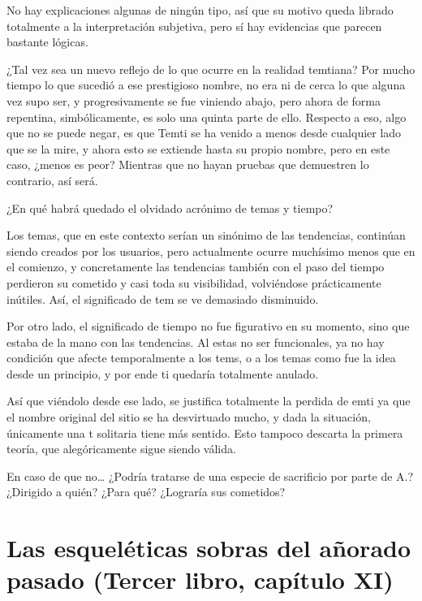 \documentclass[
  spanish,
]{book}
\begin{document}
No hay explicaciones algunas de ningún tipo, así que su motivo queda librado totalmente a la interpretación subjetiva, pero sí hay evidencias que parecen bastante lógicas.

¿Tal vez sea un nuevo reflejo de lo que ocurre en la realidad temtiana? Por mucho tiempo lo que sucedió a ese prestigioso nombre, no era ni de cerca lo que alguna vez supo ser, y progresivamente se fue viniendo abajo, pero ahora de forma repentina, simbólicamente, es solo una quinta parte de ello. Respecto a eso, algo que no se puede negar, es que Temti se ha venido a menos desde cualquier lado que se la mire, y ahora esto se extiende hasta su propio nombre, pero en este caso, ¿menos es peor? Mientras que no hayan pruebas que demuestren lo contrario, así será.

¿En qué habrá quedado el olvidado acrónimo de temas y tiempo?

Los temas, que en este contexto serían un sinónimo de las tendencias, continúan siendo creados por los usuarios, pero actualmente ocurre muchísimo menos que en el comienzo, y concretamente las tendencias también con el paso del tiempo perdieron su cometido y casi toda su visibilidad, volviéndose prácticamente inútiles. Así, el significado de tem se ve demasiado disminuido.

Por otro lado, el significado de tiempo no fue figurativo en su momento, sino que estaba de la mano con las tendencias. Al estas no ser funcionales, ya no hay condición que afecte temporalmente a los tems, o a los temas como fue la idea desde un principio, y por ende ti quedaría totalmente anulado.

Así que viéndolo desde ese lado, se justifica totalmente la perdida de emti ya que el nombre original del sitio se ha desvirtuado mucho, y dada la situación, únicamente una t solitaria tiene más sentido. Esto tampoco descarta la primera teoría, que alegóricamente sigue siendo válida.

En caso de que no\ldots{} ¿Podría tratarse de una especie de sacrificio por parte de A.? ¿Dirigido a quién? ¿Para qué? ¿Lograría sus cometidos?

\hypertarget{las-esqueluxe9ticas-sobras-del-auxf1orado-pasado-tercer-libro-capuxedtulo-xi}{%
\section{Las esqueléticas sobras del añorado pasado (Tercer libro, capítulo XI)}\label{las-esqueluxe9ticas-sobras-del-auxf1orado-pasado-tercer-libro-capuxedtulo-xi}}
\end{document}
